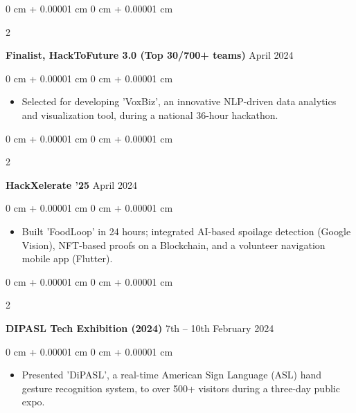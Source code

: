 \documentclass[10pt, letterpaper]{article}
\newenvironment{highlights}{
    \begin{itemize}[
        topsep=0.10 cm,
        parsep=0.10 cm,
        partopsep=0pt,
        itemsep=0pt,
        leftmargin=0 cm + 10pt
    ]
}{
    \end{itemize}
} %
\newenvironment{onecolentry}{
    \begin{adjustwidth}{
        0 cm + 0.00001 cm
    }{
        0 cm + 0.00001 cm
    }
}{
    \end{adjustwidth}
} %
\newenvironment{twocolentry}[2][]{
    \onecolentry
    \def\secondColumn{#2}
    \setcolumnwidth{\fill, 4.5 cm}
    \begin{paracol}{2}
}{
    \switchcolumn \raggedleft \secondColumn
    \end{paracol}
    \endonecolentry
} %
\begin{document}
        \begin{twocolentry}{
            April 2024
        }
            \textbf{Finalist, HackToFuture 3.0 (Top 30/700+ teams)}\end{twocolentry}
        \vspace{0.05 cm}
        \begin{onecolentry}
            \begin{highlights}
                \item Selected for developing 'VoxBiz', an innovative NLP-driven data analytics and visualization tool, during a national 36-hour hackathon.
            \end{highlights}
        \end{onecolentry}

        \vspace{0.2 cm}

        \begin{twocolentry}{
            April 2024
        }
            \textbf{HackXelerate '25}\end{twocolentry}
        \vspace{0.05 cm}
        \begin{onecolentry}
            \begin{highlights}
                \item Built 'FoodLoop' in 24 hours; integrated AI-based spoilage detection (Google Vision), NFT-based proofs on a Blockchain, and a volunteer navigation mobile app (Flutter).
            \end{highlights}
        \end{onecolentry}

        \vspace{0.2 cm}

        \begin{twocolentry}{
            7th – 10th February 2024
        }
            \textbf{DIPASL Tech Exhibition (2024)}\end{twocolentry}
        \vspace{0.05 cm}
        \begin{onecolentry}
            \begin{highlights}
                \item Presented 'DiPASL', a real-time American Sign Language (ASL) hand gesture recognition system, to over 500+ visitors during a three-day public expo.
            \end{highlights}
        \end{onecolentry}
\end{document}

